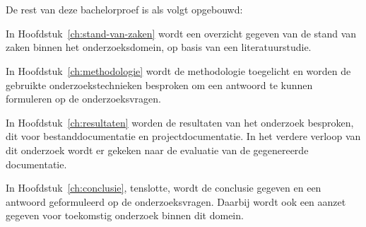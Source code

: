 \section{}%
\label{sec:opzet-bachelorproef}


De rest van deze bachelorproef is als volgt opgebouwd:

In Hoofdstuk~\ref{ch:stand-van-zaken} wordt een overzicht gegeven van de stand van zaken binnen het onderzoeksdomein, op basis van een literatuurstudie.

In Hoofdstuk~\ref{ch:methodologie} wordt de methodologie toegelicht en worden de gebruikte onderzoekstechnieken besproken om een antwoord te kunnen formuleren op de onderzoeksvragen.


In Hoofdstuk~\ref{ch:resultaten} worden de resultaten van het onderzoek besproken, dit voor bestanddocumentatie en projectdocumentatie.
In het verdere verloop van dit onderzoek wordt er gekeken naar de evaluatie van de gegenereerde documentatie.

In Hoofdstuk~\ref{ch:conclusie}, tenslotte, wordt de conclusie gegeven en een antwoord geformuleerd op de onderzoeksvragen. Daarbij wordt ook een aanzet gegeven voor toekomstig onderzoek binnen dit domein.